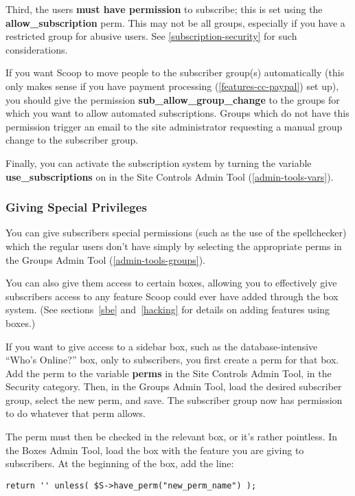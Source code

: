 Third, the users {\bf must have permission} to subscribe; this is set using the {\bf allow\_subscription} perm.  This may not be all groups, especially if you have a restricted group for abusive users.  See \ref{subscription-security} for such considerations.

If you want Scoop to move people to the subscriber group(s) automatically (this only makes sense if you have payment processing (\ref{features-cc-paypal}) set up), you should give the permission {\bf sub\_allow\_group\_change} to the groups for which you want to allow automated subscriptions.  Groups which do not have this permission trigger an email to the site administrator requesting a manual group change to the subscriber group.

Finally, you can activate the subscription system by turning the variable {\bf use\_subscriptions} on in the Site Controls Admin Tool (\ref{admin-tools-vars}).

\subsubsection{Giving Special Privileges}

You can give subscribers special permissions (such as the use of the spellchecker) which the regular users don't have simply by selecting the appropriate perms in the Groups Admin Tool (\ref{admin-tools-groups}).

You can also give them access to certain boxes, allowing you to effectively give subscribers access to any feature Scoop could ever have added through the box system.  (See sections~\ref{sbe} and~\ref{hacking} for details on adding features using boxes.)

If you want to give access to a sidebar box, such as the database-intensive ``Who's Online?'' box, only to subscribers, you first create a perm for that box.  Add the perm to the variable {\bf perms} in the Site Controls Admin Tool, in the Security category.  Then, in the Groups Admin Tool, load the desired subscriber group, select the new perm, and save.  The subscriber group now has permission to do whatever that perm allows.

The perm must then be checked in the relevant box, or it's rather pointless.  In the Boxes Admin Tool, load the box with the feature you are giving to subscribers.  At the beginning of the box, add the line:

\begin{verbatim}
return '' unless( $S->have_perm("new_perm_name") );
\end{verbatim}

